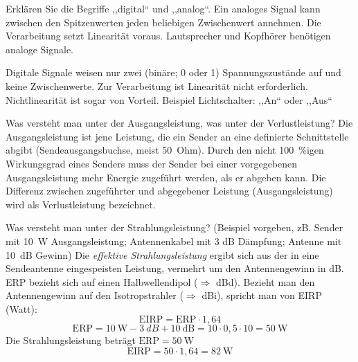 \documentclass[avery5371,grid,frame,a4paper]{flashcards}
\newcommand{\card}[3]{
  \begin{flashcard}[{\chap} -- #1]{#2}#3\end{flashcard}
}
\begin{document}
\card{27}{Erklären Sie die Begriffe ,,digital`` und ,,analog``.}{
  Ein analoges Signal kann zwischen den Spitzenwerten jeden beliebigen Zwischenwert annehmen. Die Verarbeitung setzt Linearität voraus. Lautsprecher und Kopfhörer benötigen analoge Signale.

  Digitale Signale weisen nur zwei (binäre; 0 oder 1) Spannungszustände auf und keine Zwischenwerte. Zur Verarbeitung ist Linearität nicht erforderlich. Nichtlinearität ist sogar von Vorteil. Beispiel Lichtschalter: ,,An`` oder ,,Aus``}
\card{28}{Was versteht man unter der Ausgangsleistung, was unter der Verlustleistung?}{
  Die Ausgangsleistung ist jene Leistung, die ein Sender an eine definierte Schnittstelle abgibt (Sendeausgangsbuchse, meist 50~Ohm). Durch den nicht \SI{100}{\percent}igen Wirkungsgrad eines Senders muss der Sender bei einer vorgegebenen Ausgangsleistung mehr Energie zugeführt werden, als er abgeben kann. Die Differenz zwischen zugeführter und abgegebener Leistung (Ausgangsleistung) wird als Verlustleistung bezeichnet.
}
\card{29}{Was versteht man unter der Strahlungsleistung? (Beispiel vorgeben, zB. Sender mit \SI{10}{\watt} Ausgangsleistung; Antennenkabel mit 3 dB Dämpfung; Antenne mit \SI{10}{\dB} Gewinn)}{
  \small
  Die \emph{effektive Strahlungsleistung} ergibt sich aus der in eine Sendeantenne eingespeisten Leistung, vermehrt um den Antennengewinn in dB. ERP bezieht sich auf einen Halbwellendipol ($\Rightarrow$ dBd). Bezieht man den Antennengewinn auf den Isotropstrahler ($\Rightarrow$ dBi), spricht man von EIRP (Watt):
  \[ \text{EIRP} = \text{ERP} \cdot 1,64 \]
  \[ \text{ERP} = \SI{10}{\watt}- 3~dB + \SI{10}{\dB} = 10 \cdot 0,5 \cdot 10 = \SI{50}{\watt} \]
  Die Strahlungsleistung beträgt $\text{ERP} = \SI{50}{\watt}$
  \[ \text{EIRP} = 50 \cdot 1,64 = \SI{82}{\watt} \]
}
\end{document}
